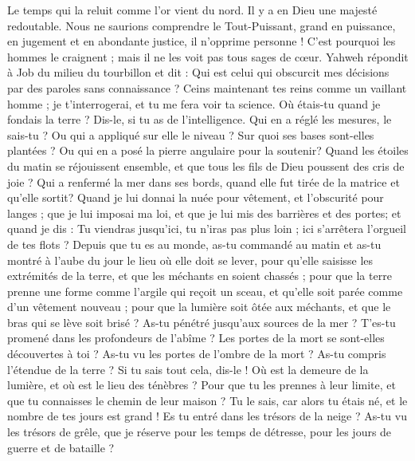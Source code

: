 \begin{multicols}{2}
{Le temps qui la reluit comme l'or vient du nord. Il y a en Dieu une majesté redoutable.
Nous ne saurions comprendre le Tout-Puissant, grand en puissance, en jugement et en abondante justice, il n'opprime personne !
C'est pourquoi les hommes le craignent ; mais il ne les voit pas tous sages de cœur.
\VerseOne{}Yahweh répondit à Job du milieu du tourbillon et dit :
Qui est celui qui obscurcit mes décisions par des paroles sans connaissance ?
Ceins maintenant tes reins comme un vaillant homme ; je t'interrogerai, et tu me fera voir ta science.
Où étais-tu quand je fondais la terre ? Dis-le, si tu as de l'intelligence.
Qui en a réglé les mesures, le sais-tu ? Ou qui a appliqué sur elle le niveau ?
Sur quoi ses bases sont-elles plantées ? Ou qui en a posé la pierre angulaire pour la soutenir?
Quand les étoiles du matin se réjouissent ensemble, et que tous les fils de Dieu poussent des cris de joie  ?
Qui a renfermé la mer dans ses bords, quand elle fut tirée de la matrice et qu'elle sortit? 
Quand je lui donnai la nuée pour vêtement, et l'obscurité pour langes ;
que je lui imposai ma loi, et que je lui mis des barrières et des portes;
 et quand je dis : Tu viendras jusqu'ici, tu n'iras pas plus loin ; ici s'arrêtera l'orgueil de tes flots ?
Depuis que tu es au monde, as-tu commandé au matin et as-tu montré à l'aube du jour le lieu où elle doit se lever,
pour qu'elle saisisse les extrémités de la terre, et que les méchants en soient chassés ;
pour que la terre prenne une forme comme l'argile qui reçoit un sceau, et qu'elle soit parée comme d'un vêtement nouveau ;
pour que la lumière soit ôtée aux méchants, et que le bras qui se lève soit brisé ?
As-tu pénétré jusqu'aux sources de la mer ? T'es-tu promené dans les profondeurs de l'abîme ?
Les portes de la mort se sont-elles découvertes à toi ? As-tu vu les portes de l'ombre de la mort ?
As-tu compris l'étendue de la terre ? Si tu sais tout cela, dis-le !
Où est la demeure de la lumière, et où est le lieu des ténèbres ?
Pour que tu les prennes à leur limite, et que tu connaisses le chemin de leur maison ?
Tu le sais, car alors tu étais né, et le nombre de tes jours est grand !
Es tu entré dans les trésors de la neige ? As-tu vu les trésors de grêle,
que je réserve pour les temps de détresse, pour les jours de guerre et de bataille ?
}
\end{multicols}
